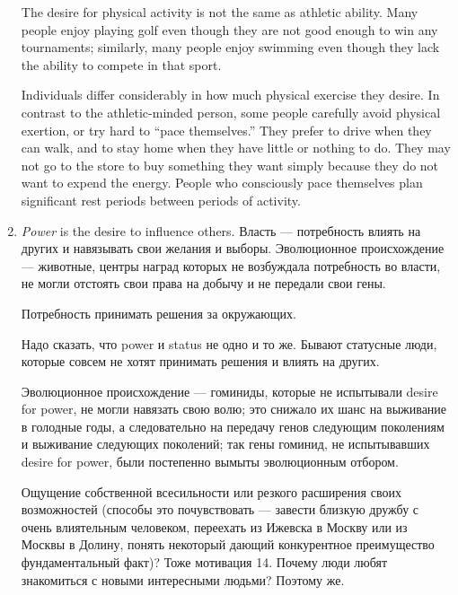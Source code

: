 \documentclass[11pt]{article}
\theoremstyle{remark}
\theoremstyle{definition}
\begin{document}
\begin{enumerate}

The desire for physical activity is not the same as athletic ability. Many people enjoy playing golf even though they are not good enough to win any tournaments; similarly, many people enjoy swimming even though they lack the ability to compete in that sport.

Individuals differ considerably in how much physical exercise they desire. In contrast to the athletic-minded person, some people carefully avoid physical exertion, or try hard to “pace themselves.” They prefer to drive when they can walk, and to stay home when they have little or nothing to do. They may not go to the store to buy something they want simply because they do not want to expend the energy. People who consciously pace themselves plan significant rest periods between periods of activity.



\item \textit{Power} is the desire to influence others. Власть --- потребность влиять на других и навязывать свои желания и выборы. Эволюционное происхождение --- животные, центры наград которых не возбуждала потребность во власти, не могли отстоять свои права на добычу и не передали свои гены.

Потребность принимать решения за окружающих.

Надо сказать, что power и status не одно и то же. Бывают статусные люди, которые совсем не хотят принимать решения и влиять на других.

Эволюционное происхождение --- гоминиды, которые не испытывали desire for power, не могли навязать свою волю; это снижало их шанс на выживание в голодные годы, а следовательно на передачу генов следующим поколениям и выживание следующих поколений; так гены гоминид, не испытывавших desire for power, были постепенно вымыты эволюционным отбором. 





Ощущение собственной всесильности или резкого расширения своих возможностей (способы это почувствовать — завести близкую дружбу с очень влиятельным человеком, переехать из Ижевска в Москву или из Москвы в Долину, понять некоторый дающий конкурентное преимущество фундаментальный факт)? Тоже мотивация 14. Почему люди любят знакомиться с новыми интересными людьми? Поэтому же.


\end{enumerate}
\end{document}
